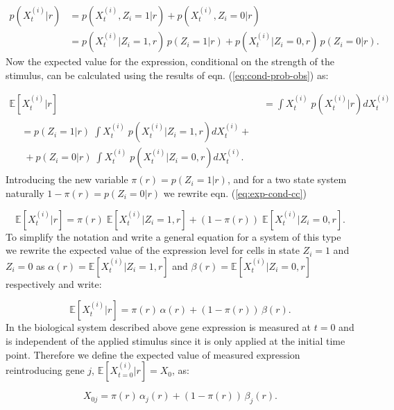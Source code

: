 \begin{align}
  p(X_{t}^{(i)} | r) &= p(X_{t}^{(i)}, Z_i =1 | r) + p(X_{t}^{(i)}, Z_i =0 | r)\\
  &= p(X_{t}^{(i)}| Z_i =1,  r) \, p(Z_i =1 | r) + p(X_{t}^{(i)}| Z_i =0,  r) \, p(Z_i =0 | r).
  \label{eq:cond-prob-obs}
\end{align}
Now the expected value for the expression, conditional on the strength of the stimulus, can be calculated using the results of eqn. (\ref{eq:cond-prob-obs}) as:

\begin{align}
  \mathbb{E} [X_t^{(i)} | r] &= \int X_t^{(i)} \; p(X_t^{(i)}| r) dX_t^{(i)} \\
  \begin{split}
    &= p(Z_i = 1| r)\; \int X_t^{(i)} \; p(X_t^{(i)}|Z_i = 1, r) dX_t^{(i)} + \label{eq:exp-cond-cc} \\
    & \; + p(Z_i = 0| r)\; \int X_t^{(i)} \; p(X_t^{(i)}|Z_i = 0, r) dX_t^{(i)}.
  \end{split}
\end{align}
Introducing the new variable $\pi(r) = p(Z_i = 1 | r)$, and for a two state system naturally  $1 - \pi(r) = p(Z_i = 0 | r)$ we rewrite eqn. (\ref{eq:exp-cond-cc})

\begin{equation}
  \mathbb{E} [X_t^{(i)} | r] = \pi(r)\; \mathbb{E} [X_t^{(i)} | Z_i =1, r] + \left( 1 - \pi(r) \right)\; \mathbb{E} [X_t^{(i)} | Z_i =0, r].
\end{equation}
To simplify the notation and write a general equation for a system of this type we rewrite the expected value of the expression level for cells in state $Z_i = 1$ and $Z_i = 0$ as $\alpha(r) = \mathbb{E} [X_t^{(i)} | Z_i =1, r]$ and  $\beta(r) =  \mathbb{E} [X_t^{(i)} | Z_i = 0, r]$ respectively and write:

\begin{equation}
  \label{eq:general-cc}
  \mathbb{E} [X_t^{(i)} | r] = \pi(r) \, \alpha(r) + \left( 1 - \pi(r) \right) \, \beta(r).
\end{equation}
In the biological system described above gene expression is measured at $t=0$ and is independent of the applied stimulus since it is only applied at the initial time point. Therefore we define the expected value of measured expression reintroducing gene $j$,  $\mathbb{E}[X_{t=0}^{(i)} | r] = X_0 $, as:

\begin{equation}
  \label{eq:init-cc}
  X_{0j} = \pi(r) \, \alpha_j(r) + \left( 1 - \pi(r) \right) \, \beta_j(r).
\end{equation}

